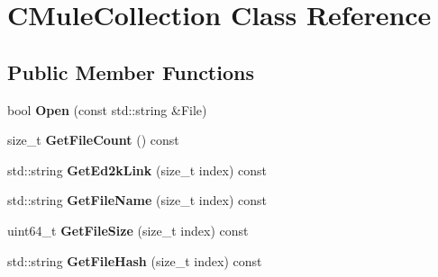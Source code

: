 \section{CMuleCollection Class Reference}
\label{classCMuleCollection}
\subsection*{Public Member Functions}
\begin{DoxyCompactItemize}
\item 
bool {\bfseries Open} (const std::string \&File)\label{classCMuleCollection_ad5f2debd9c8c0fd1a4f153f1cba320a1}

\item 
size\_\-t {\bfseries GetFileCount} () const \label{classCMuleCollection_a157bb941021f96977770e2d036271583}

\item 
std::string {\bfseries GetEd2kLink} (size\_\-t index) const \label{classCMuleCollection_ae0a72bd028566dee75be0e3eb27ea688}

\item 
std::string {\bfseries GetFileName} (size\_\-t index) const \label{classCMuleCollection_abca759943dd587345a63fb0333712ab6}

\item 
uint64\_\-t {\bfseries GetFileSize} (size\_\-t index) const \label{classCMuleCollection_a19cabf8303d16beb0ca069dd73859686}

\item 
std::string {\bfseries GetFileHash} (size\_\-t index) const \label{classCMuleCollection_ada02bf7edf0552678da6962efe19e11e}

\end{DoxyCompactItemize}
